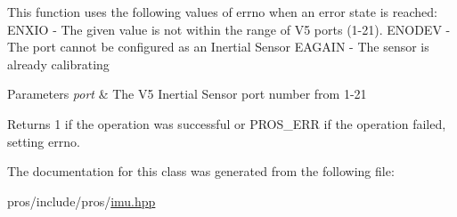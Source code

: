 This function uses the following values of errno when an error state is reached\+: E\+N\+X\+IO -\/ The given value is not within the range of V5 ports (1-\/21). E\+N\+O\+D\+EV -\/ The port cannot be configured as an Inertial Sensor E\+A\+G\+A\+IN -\/ The sensor is already calibrating


\begin{DoxyParams}{Parameters}
{\em port} & The V5 Inertial Sensor port number from 1-\/21 \\
\hline
\end{DoxyParams}
\begin{DoxyReturn}{Returns}
1 if the operation was successful or P\+R\+O\+S\+\_\+\+E\+RR if the operation failed, setting errno. 
\end{DoxyReturn}


The documentation for this class was generated from the following file\+:\begin{DoxyCompactItemize}
\item 
pros/include/pros/\hyperlink{imu_8hpp}{imu.\+hpp}\end{DoxyCompactItemize}
